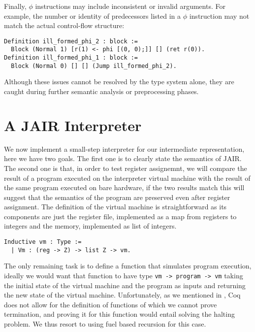 Finally, $\phi$ instructions may include inconsistent or invalid arguments. For example, the number or identity of predecessors listed in a $\phi$ instruction may not match the actual control-flow structure:

\begin{lstlisting}[style=Coq]
Definition ill_formed_phi_2 : block :=
  Block (Normal 1) [r(1) <- phi [(0, 0);]] [] (ret r(0)).
Definition ill_formed_phi_1 : block :=
  Block (Normal 0) [] [] (Jump ill_formed_phi_2).
\end{lstlisting}

Although these issues cannot be resolved by the type system alone, they are caught during further semantic analysis or preprocessing phases.

\section{A JAIR Interpreter}
\label{sec:jair-int}

We now implement a small-step interpreter for our intermediate representation, here we have two goals.
The first one is to clearly state the semantics of JAIR. The second one is that, in order to test register assignemnt, we will compare the result of a program executed on the interpreter virtual machine with the result of the same program executed on bare hardware, if the two results match this will suggest that the semantics of the program are preserved even after register assignment.
The definition of the virtual machine is straightforward as its components are just the register file, implemented as a map from registers to integers and the memory, implemented as list of integers.

\begin{lstlisting}[style=Coq]
Inductive vm : Type :=
  | Vm : (reg -> Z) -> list Z -> vm.
\end{lstlisting}

The only remaining task is to define a function that simulates program execution, ideally we would want that function to have type \texttt{vm -> program -> vm} taking the initial state of the virtual machine and the program as inputs and returning the new state of the virtual machine.
Unfortunately, as we mentioned in , Coq does not allow for the definition of functions of which we cannot prove termination, and proving it for this function would entail solving the halting problem. We thus resort to using fuel based recursion for this case.


